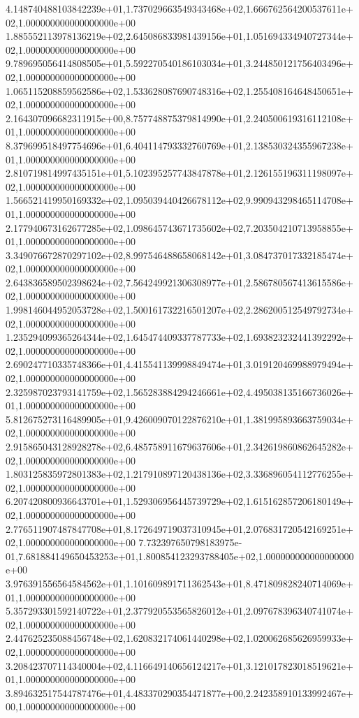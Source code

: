 4.148740488103842239e+01,1.737029663549343468e+02,1.666762564200537611e+02,1.000000000000000000e+00
1.885552113978136219e+02,2.645086833981439156e+01,1.051694334940727344e+02,1.000000000000000000e+00
9.789695056414808505e+01,5.592270540186103034e+01,3.244850121756403496e+02,1.000000000000000000e+00
1.065115208859562586e+02,1.533628087690748316e+02,1.255408164648450651e+02,1.000000000000000000e+00
2.164307096682311915e+00,8.757748875379814990e+01,2.240500619316112108e+01,1.000000000000000000e+00
8.379699518497754696e+01,6.404114793332760769e+01,2.138530324355967238e+01,1.000000000000000000e+00
2.810719814997435151e+01,5.102395257743847878e+01,2.126155196311198097e+02,1.000000000000000000e+00
1.566521419950169332e+02,1.095039440426678112e+02,9.990943298465114708e+01,1.000000000000000000e+00
2.177940673162677285e+02,1.098645743671735602e+02,7.203504210713958855e+01,1.000000000000000000e+00
3.349076672870297102e+02,8.997546488658068142e+01,3.084737017332185474e+02,1.000000000000000000e+00
2.643836589502398624e+02,7.564249921306308977e+01,2.586780567413615586e+02,1.000000000000000000e+00
1.998146044952053728e+02,1.500161732216501207e+02,2.286200512549792734e+02,1.000000000000000000e+00
1.235294099365264344e+02,1.645474409337787733e+02,1.693823232441392292e+02,1.000000000000000000e+00
2.690247710335748366e+01,4.415541139998849474e+01,3.019120469988979494e+02,1.000000000000000000e+00
2.325987023793141759e+02,1.565283884294246661e+02,4.495038135166736026e+01,1.000000000000000000e+00
5.812675273116489905e+01,9.426009070122876210e+01,1.381995893663759034e+02,1.000000000000000000e+00
2.915865043128928278e+02,6.485758911679637606e+01,2.342619860862645282e+02,1.000000000000000000e+00
1.803125835972801383e+02,1.217910897120438136e+02,3.336896054112776255e+02,1.000000000000000000e+00
6.207420800936643701e+01,1.529306956445739729e+02,1.615162857206180149e+02,1.000000000000000000e+00
2.776511907487847708e+01,8.172649719037310945e+01,2.076831720542169251e+02,1.000000000000000000e+00
7.732397650798183975e-01,7.681884149650453253e+01,1.800854123293788405e+02,1.000000000000000000e+00
3.976391556564584562e+01,1.101609891711362543e+01,8.471809828240714069e+01,1.000000000000000000e+00
5.357293301592140722e+01,2.377920553565826012e+01,2.097678396340741074e+02,1.000000000000000000e+00
2.447625235088456748e+02,1.620832174061440298e+02,1.020062685626959933e+02,1.000000000000000000e+00
3.208423707114340004e+02,4.116649140656124217e+01,3.121017823018519621e+01,1.000000000000000000e+00
3.894632517544787476e+01,4.483370290354471877e+00,2.242358910133992467e+00,1.000000000000000000e+00
